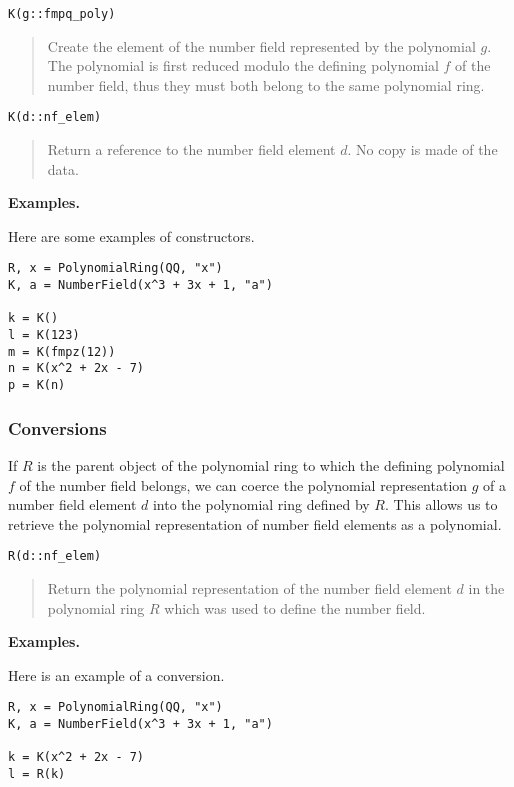 \documentclass[a4paper,10pt]{article}
\newcommand{\desc}[1]{\vspace{-3mm}\begin{quote}#1\end{quote}}
\begin{document}
{{\begin{lstlisting}
K(g::fmpq_poly)
\end{lstlisting}

\desc{Create the element of the number field represented by the polynomial
$g$. The polynomial is first reduced modulo the defining polynomial $f$ of
the number field, thus they must both belong to the same polynomial ring.}

\begin{lstlisting}
K(d::nf_elem)
\end{lstlisting}

\desc{Return a reference to the number field element $d$. No copy is made
of the data.}

\textbf{Examples.}

Here are some examples of constructors.

\begin{lstlisting}
R, x = PolynomialRing(QQ, "x")
K, a = NumberField(x^3 + 3x + 1, "a")

k = K()
l = K(123)
m = K(fmpz(12))
n = K(x^2 + 2x - 7)
p = K(n)
\end{lstlisting}

\subsubsection{Conversions}

If $R$ is the parent object of the polynomial ring to which the defining
polynomial $f$ of the number field belongs, we can coerce the polynomial
representation $g$ of a number field element $d$ into the polynomial ring
defined by $R$. This allows us to retrieve the polynomial representation
of number field elements as a polynomial.

\begin{lstlisting}
R(d::nf_elem)
\end{lstlisting}

\desc{Return the polynomial representation of the number field element $d$
in the polynomial ring $R$ which was used to define the number field.}

\textbf{Examples.}

Here is an example of a conversion.

\begin{lstlisting}
R, x = PolynomialRing(QQ, "x")
K, a = NumberField(x^3 + 3x + 1, "a")

k = K(x^2 + 2x - 7)
l = R(k)
\end{lstlisting}

}}
\end{document}
